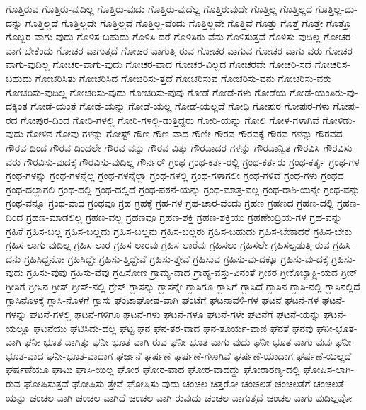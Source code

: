 {ಗೊತ್ತಿರುವ
ಗೊತ್ತಿರು-ವುದಿಲ್ಲ
ಗೊತ್ತಿರು-ವುದು
ಗೊತ್ತಿರು-ವುದೆಲ್ಲ
ಗೊತ್ತಿರುವುದೇ
ಗೊತ್ತಿಲ್ಲ
ಗೊತ್ತಿಲ್ಲದ
ಗೊತ್ತಿಲ್ಲ-ದು-ದನ್ನು
ಗೊತ್ತಿಲ್ಲದೆ
ಗೊತ್ತಿಲ್ಲದೇ
ಗೊತ್ತಿಲ್ಲವೆ
ಗೊತ್ತಿಲ್ಲ-ವೆಂದು
ಗೊತ್ತಿಲ್ಲವೇ
ಗೊತ್ತಿವೆ
ಗೊತ್ತು
ಗೊತ್ತೆ
ಗೊತ್ತೇ
ಗೊತ್ತೊ
ಗೊಬ್ಬರ-ವಾಗು-ವುದು
ಗೊಳಿಸ-ಬಹುದು
ಗೊಳಿಸಿ-ದರೆ
ಗೊಳಿಸಿರು-ವೆನು
ಗೊಳಿಸುತ್ತವೆ
ಗೊಳಿಸು-ವುದಿಲ್ಲ
ಗೋಚರ-ವಾಗ-ಬೇಕೆಂದು
ಗೋಚರ-ವಾಗುತ್ತದೆ
ಗೋಚರ-ವಾಗುತ್ತಿ-ರುವ
ಗೋಚರ-ವಾಗುವ
ಗೋಚರ-ವಾಗು-ವರು
ಗೋಚರ-ವಾಗು-ವುದಿಲ್ಲ
ಗೋಚರ-ವಾಗು-ವುದು
ಗೋಚರ-ವಾದ
ಗೋಚರ-ವಿಲ್ಲದ
ಗೋಚರವೇ
ಗೋಚರಿ-ಸದೆ
ಗೋಚರಿಸ-ಬಹುದು
ಗೋಚರಿಸಿತು
ಗೋಚರಿಸಿದ
ಗೋಚರಿಸು-ತ್ತದೆ
ಗೋಚರಿಸುವ
ಗೋಚರಿಸು-ವನು
ಗೋಚರಿಸು-ವರು
ಗೋಚರಿಸು-ವುದಿಲ್ಲ
ಗೋಚರಿಸು-ವುದು
ಗೋಚರಿಸು-ವುವು
ಗೋಡೆ
ಗೋಡೆ-ಗಳು
ಗೋಡೆಯ
ಗೋಡೆ-ಯಂತಿರು-ವು-ದಕ್ಕಿಂತ
ಗೋಡೆ-ಯಂತೆ
ಗೋಡೆ-ಯನ್ನು
ಗೋಡೆ-ಯಲ್ಲ
ಗೋಡೆ-ಯಲ್ಲದೆ
ಗೋಧಿ
ಗೋಪುರ
ಗೋಪುರ-ಗಳು
ಗೋಪು-ರದ
ಗೋಪುರ-ದಿಂದ
ಗೋರಿ-ಗಳಲ್ಲಿ
ಗೋರಿ-ಗಳಲ್ಲಿ-ಡುತ್ತಿದ್ದರು
ಗೋರಿ-ಯನ್ನು
ಗೋಲಿ
ಗೋಳ-ಗಳಾಗಿವೆ
ಗೋಳಿಡು-ವುದು
ಗೋಳಿನ
ಗೋವು-ಗಳನ್ನು
ಗೋಸ್ಟ್
ಗೌಣ
ಗೌಣ-ವಾದ
ಗೌಣೀ
ಗೌರವ
ಗೌರವಕ್ಕೆ
ಗೌರವ-ಗಳನ್ನು
ಗೌರವದ
ಗೌರವ-ದಿಂದ
ಗೌರವ-ದಿಂದಲೇ
ಗೌರವ-ವನ್ನು
ಗೌರವ-ವಿತ್ತು
ಗೌರವಾದರ-ಗಳನ್ನು
ಗೌರವಾನ್ವಿತ
ಗೌರವಿಸಿ
ಗೌರವಿಸು-ವರು
ಗೌರವಿಸು-ವುದಕ್ಕೆ
ಗೌರವಿಸು-ವುದಿಲ್ಲ
ಗೌರ್ನರ್
ಗ್ರಂಥ
ಗ್ರಂಥ-ಕರ್ತ-ರಲ್ಲಿ
ಗ್ರಂಥ-ಕರ್ತರು
ಗ್ರಂಥ-ಕರ್ತೃ
ಗ್ರಂಥ-ಗಳ
ಗ್ರಂಥ-ಗಳನ್ನು
ಗ್ರಂಥ-ಗಳನ್ನೆಲ್ಲ
ಗ್ರಂಥ-ಗಳನ್ನೆಲ್ಲಾ
ಗ್ರಂಥ-ಗಳಲ್ಲಿ
ಗ್ರಂಥ-ಗಳಾಗಲೀ
ಗ್ರಂಥ-ಗಳಿವೆ
ಗ್ರಂಥ-ಗಳು
ಗ್ರಂಥದ
ಗ್ರಂಥ-ದಲ್ಲಾಗಲಿ
ಗ್ರಂಥ-ದಲ್ಲಿ
ಗ್ರಂಥ-ದಲ್ಲಿದೆ
ಗ್ರಂಥ-ಪಠನೆ-ಯನ್ನು
ಗ್ರಂಥ-ಮಾತ್ರ-ವಲ್ಲ
ಗ್ರಂಥ-ರಾಶಿ-ಯನ್ನೇ
ಗ್ರಂಥ-ವನ್ನು
ಗ್ರಂಥ-ವನ್ನೂ
ಗ್ರಂಥ-ವಾದ
ಗ್ರಂಥವೂ
ಗ್ರಹ
ಗ್ರಹಕ್ಕೆ
ಗ್ರಹ-ಗಳ
ಗ್ರಹ-ಚಾರ-ವೆಂದು
ಗ್ರಹಣ
ಗ್ರಹಣದ
ಗ್ರಹಣ-ದಲ್ಲಿ
ಗ್ರಹಣ-ದಿಂದ
ಗ್ರಹಣ-ಮಾಡಲಿಲ್ಲ
ಗ್ರಹಣ-ವಲ್ಲ
ಗ್ರಹಣವೂ
ಗ್ರಹಣ-ಶಕ್ತಿ
ಗ್ರಹಣ-ಶಕ್ತಿಯು
ಗ್ರಹಣೇಂದ್ರಿಯ-ಗಳ
ಗ್ರಹ-ವನ್ನು
ಗ್ರಹಿಕೆ
ಗ್ರಹಿಸ-ಬಲ್ಲ
ಗ್ರಹಿಸ-ಬಲ್ಲದು
ಗ್ರಹಿಸ-ಬಲ್ಲನು
ಗ್ರಹಿಸ-ಬಲ್ಲರು
ಗ್ರಹಿಸ-ಬಹುದು
ಗ್ರಹಿಸ-ಬೇಕಾದರೆ
ಗ್ರಹಿಸ-ಬೇಕು
ಗ್ರಹಿಸ-ಲಾಗು-ವುದಿಲ್ಲ
ಗ್ರಹಿಸ-ಲಾರ
ಗ್ರಹಿಸ-ಲಾರವು
ಗ್ರಹಿಸ-ಲಾರೆವು
ಗ್ರಹಿಸಲು
ಗ್ರಹಿಸಲೇ
ಗ್ರಹಿಸಲ್ಪಡುತ್ತಿ-ರುವ
ಗ್ರಹಿಸಿ-ದನು
ಗ್ರಹಿಸಿದ್ದನೋ
ಗ್ರಹಿಸಿದ್ದೇ
ಗ್ರಹಿಸು-ತ್ತಿದ್ದೇವೆ
ಗ್ರಹಿಸು-ತ್ತೇವೆ
ಗ್ರಹಿಸುವ
ಗ್ರಹಿಸು-ವು-ದಕ್ಕೂ
ಗ್ರಹಿಸು-ವು-ದಕ್ಕೆ
ಗ್ರಹಿಸು-ವುದು
ಗ್ರಹಿಸು-ವುವು
ಗ್ರಹಿಸು-ವೆವು
ಗ್ರಹಿಸೋಣ
ಗ್ರಾಮ್ಯ-ವಾದ
ಗ್ರಾಹ್ಯ-ವಸ್ತು-ವಿನಂತೆ
ಗ್ರೀಕರ
ಗ್ರೀಕೊಬ್ಯಾಕ್ಟ್ರಿ-ಯದ
ಗ್ರೀಕ್
ಗ್ರೀಸಿಗೆ
ಗ್ರೀಸಿನ
ಗ್ರೀಸ್
ಗ್ರೀಸ್-ನಲ್ಲಿ
ಗ್ರೇಸ್
ಗ್ಲಾಸನ್ನು
ಗ್ಲಾಸನ್ನೇ
ಗ್ಲಾಸಿಗೂ
ಗ್ಲಾಸಿಗೆ
ಗ್ಲಾಸಿದೆ
ಗ್ಲಾಸಿನ
ಗ್ಲಾಸಿ-ನಲ್ಲಿ
ಗ್ಲಾಸಿನಲ್ಲಿದೆ
ಗ್ಲಾಸಿನೊಳಕ್ಕೆ
ಗ್ಲಾಸಿ-ನೊಳಗೆ
ಗ್ಲಾಸು
ಘಂಟಾಘೋಷ-ವಾಗಿ
ಘಂಟೆಗೆ
ಘಟನಾವಳಿ-ಗಳ
ಘಟನೆ
ಘಟನೆ-ಗಳ
ಘಟನೆ-ಗಳನ್ನು
ಘಟನೆ-ಗಳಲ್ಲಿ
ಘಟನೆ-ಗಳಿಗೂ
ಘಟನೆ-ಗಳು
ಘಟನೆ-ಗಳೂ
ಘಟನೆ-ಗಳೇ
ಘಟನೆಗೆ
ಘಟನೆ-ಯನ್ನು
ಘಟನೆ-ಯಲ್ಲೂ
ಘಟನೆಯು
ಘಟಿಸಿದು-ದಲ್ಲ
ಘಟ್ಟ
ಘನ
ಘನ-ತರ-ವಾದ
ಘನ-ತೂರ್ಯ-ವಾಣಿ
ಘನತೆ
ಘನವು
ಘನೀ-ಭೂತ-ವಾಗಿ
ಘನೀ-ಭೂತ-ವಾಗಿತ್ತು
ಘನೀ-ಭೂತ-ವಾಗಿ-ರುವ
ಘನೀ-ಭೂತ-ವಾಗು-ವುದು
ಘನೀ-ಭೂತ-ವಾಗು-ವುವು
ಘನೀ-ಭೂತ-ವಾದ
ಘನೀ-ಭೂತ-ವಾದಾಗ
ಘರ್ಜನೆ
ಘರ್ಷಣೆ
ಘರ್ಷಣೆ-ಗಳಾಗಿವೆ
ಘರ್ಷಣೆ-ಯಾದಾಗ
ಘರ್ಷಣೆ-ಯಿಲ್ಲದೆ
ಘರ್ಷಣೆಯೂ
ಘಾಟು
ಘಾಸಿ-ಯಿಲ್ಲ
ಘೋರ
ಘೋರ-ವಾದ
ಘೋರ-ವಾದದ್ದು
ಘೋರಾರಣ್ಯ-ದಲ್ಲಿ
ಘೋಷಿಸ-ಲಾಗಿ-ರುವ
ಘೋಷಿಸುತ್ತವೆ
ಘೋಷಿಸು-ತ್ತೇವೆ
ಘೋಷಿಸು-ವುದು
ಚಂಚಲ-ಚಿತ್ತರೋ
ಚಂಚಲತೆ
ಚಂಚಲತೆಗೆ
ಚಂಚಲತೆ-ಯನ್ನು
ಚಂಚಲ-ವಾಗಿ
ಚಂಚಲ-ವಾಗಿದೆ
ಚಂಚಲ-ವಾಗಿ-ರುವುದು
ಚಂಚಲ-ವಾಗುತ್ತದೆ
ಚಂಚಲ-ವಾಗು-ವುದಿಲ್ಲವೋ
}
